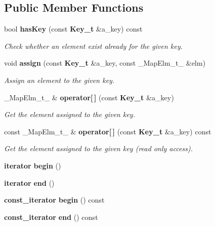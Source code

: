 \subsection*{Public Member Functions}
\begin{DoxyCompactItemize}
\item 
bool {\bf has\-Key} (const {\bf Key\-\_\-t} \&a\-\_\-key) const \label{classhistmgr_1_1KeyMap__t_a6a1c898e2de5448de3514e4691c67b8a}

\begin{DoxyCompactList}\small\item\em Check whether an element exist already for the given key. \end{DoxyCompactList}\item 
void {\bf assign} (const {\bf Key\-\_\-t} \&a\-\_\-key, const \-\_\-\-Map\-Elm\-\_\-t\-\_\- \&elm)
\begin{DoxyCompactList}\small\item\em Assign an element to the given key. \end{DoxyCompactList}\item 
\-\_\-\-Map\-Elm\-\_\-t\-\_\- \& {\bf operator[$\,$]} (const {\bf Key\-\_\-t} \&a\-\_\-key)
\begin{DoxyCompactList}\small\item\em Get the element assigned to the given key. \end{DoxyCompactList}\item 
const \-\_\-\-Map\-Elm\-\_\-t\-\_\- \& {\bf operator[$\,$]} (const {\bf Key\-\_\-t} \&a\-\_\-key) const 
\begin{DoxyCompactList}\small\item\em Get the element assigned to the given key (read only access). \end{DoxyCompactList}\item 
{\bf iterator} {\bfseries begin} ()\label{classhistmgr_1_1KeyMap__t_ad8f934b50be1b263b4151ee1eda1d91c}

\item 
{\bf iterator} {\bfseries end} ()\label{classhistmgr_1_1KeyMap__t_a04b15116bdfb56e764d4bea63c1b4933}

\item 
{\bf const\-\_\-iterator} {\bfseries begin} () const \label{classhistmgr_1_1KeyMap__t_a68aad70b6250caa7278cdfff4a77bdaa}

\item 
{\bf const\-\_\-iterator} {\bfseries end} () const \label{classhistmgr_1_1KeyMap__t_a7ffe8a8499fda4ec1a265e4c4970c012}

\end{DoxyCompactItemize}

